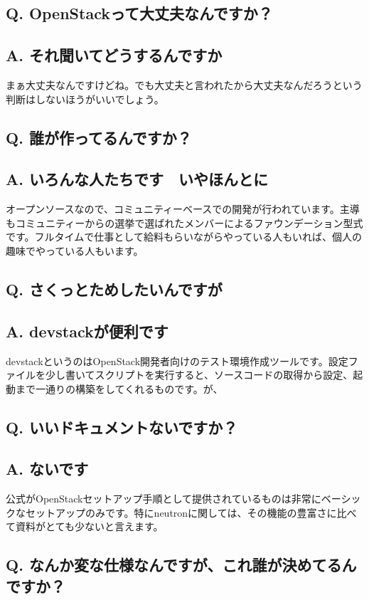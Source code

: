 \documentclass[9pt,b5paper,tombo,openany]{jsbook}
\begin{document}
\subsection*{Q. OpenStackって大丈夫なんですか？}
\subsection*{A. それ聞いてどうするんですか}
まぁ大丈夫なんですけどね。でも大丈夫と言われたから大丈夫なんだろうという判断はしないほうがいいでしょう。

\subsection*{Q. 誰が作ってるんですか？}
\subsection*{A. いろんな人たちです　いやほんとに}
オープンソースなので、コミュニティーベースでの開発が行われています。主導もコミュニティーからの選挙で選ばれたメンバーによるファウンデーション型式です。フルタイムで仕事として給料もらいながらやっている人もいれば、個人の趣味でやっている人もいます。

\subsection*{Q. さくっとためしたいんですが}
\subsection*{A. devstackが便利です}
devstackというのはOpenStack開発者向けのテスト環境作成ツールです。設定ファイルを少し書いてスクリプトを実行すると、ソースコードの取得から設定、起動まで一通りの構築をしてくれるものです。が、

\subsection*{Q. いいドキュメントないですか？}
\subsection*{A. ないです}
公式がOpenStackセットアップ手順として提供されているものは非常にベーシックなセットアップのみです。特にneutronに関しては、その機能の豊富さに比べて資料がとても少ないと言えます。

\subsection*{Q. なんか変な仕様なんですが、これ誰が決めてるんですか？}
\end{document}

